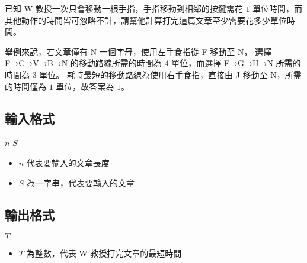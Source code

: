 已知 W 教授一次只會移動一根手指，手指移動到相鄰的按鍵需花
\begin{math}1\end{math}
單位時間，而其他動作的時間皆可忽略不計，請幫他計算打完這篇文章至少需要花多少單位時間。

舉例來說，若文章僅有 N 一個字母，使用左手食指從 F 移動至 N， 選擇
F→C→V→B→N 的移動路線所需的時間為 \begin{math}4\end{math} 單位，而選擇
F→G→H→N 所需的時間為 \begin{math}3\end{math} 單位。
耗時最短的移動路線為使用右手食指，直接由 J 移動至 N，所需的時間僅為
\begin{math}1\end{math} 單位，故答案為 \begin{math}1\end{math}。

\subsection{輸入格式}

\begin{format}
\f{
$n$
$S$
}
\end{format}

\begin{itemize}
\tightlist
\item
  \begin{math}n\end{math} 代表要輸入的文章長度
\item
  \begin{math}S\end{math} 為一字串，代表要輸入的文章
\end{itemize}

\subsection{輸出格式}

\begin{format}
\f{
$T$
}
\end{format}

\begin{itemize}
\tightlist
\item
  \begin{math}T\end{math} 為整數，代表 W 教授打完文章的最短時間
\end{itemize}

